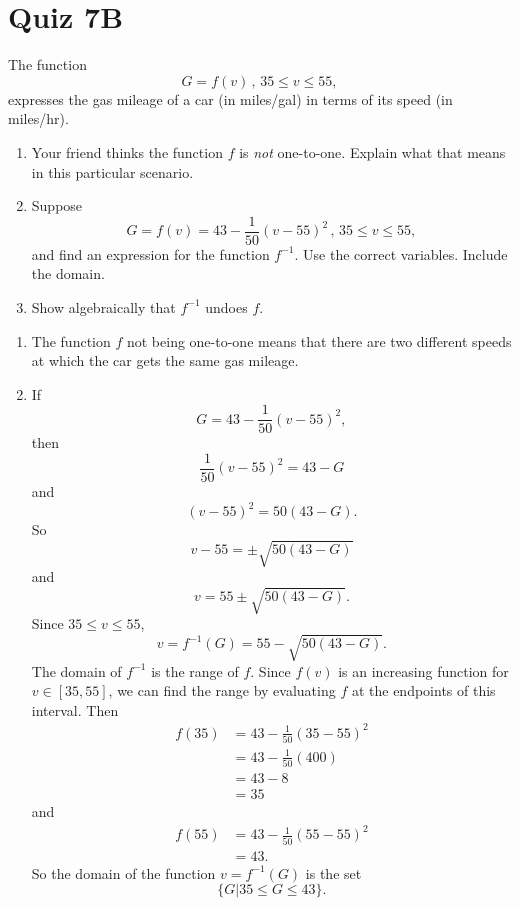 \documentclass{ximera}
\begin{document}
\section{Quiz 7B}
\begin{question} \label{Q7B9efre}
The function
\[
     G = f(v) \, , \, 35\leq v \leq 55,
\]
expresses the gas mileage of a car (in miles/gal) in terms of its speed (in miles/hr).

\begin{enumerate}

\item Your friend thinks the function $f$ is \emph{not} one-to-one. Explain what that means in this particular scenario.

\item Suppose 
\[
       G = f(v) = 43 - \frac{1}{50} \left( v-55 \right)^2 \, , \, 35\leq v \leq 55,
\]
and find an expression for the function $f^{-1}$. Use the correct variables. Include the domain.

\item Show algebraically that $f^{-1}$ undoes $f$.
\end{enumerate}

\begin{explanation}
\begin{enumerate}
\item The function $f$ not being one-to-one means that there are two different speeds at which the car gets the same gas mileage.

\item If
\[
  G = 43 - \frac{1}{50} \left( v-55 \right)^2,
\]
then
\[
       \frac{1}{50} \left( v-55 \right)^2 = 43 - G
\]
and
\[
  \left( v-55 \right)^2 = 50 (43-G).
\]
So
\[
   v - 55 = \pm \sqrt{50(43-G)}
\]
and
\[
  v = 55 \pm \sqrt{50(43-G)}.
\]
Since $35 \leq v \leq 55$,
\[
  v = f^{-1}(G) = 55 - \sqrt{50(43-G)}.
\]
The domain of $f^{-1}$ is the range of $f$. Since $f(v)$ is an increasing function for $v\in [35,55]$, we can find the range by evaluating $f$ at the endpoints of this interval. Then
\begin{align*}
 f(35) &=  43 - \frac{1}{50} \left( 35-55 \right)^2 \\
         &= 43 - \frac{1}{50}\left(400\right) \\
         &= 43 - 8 \\
         &= 35
\end{align*}
and
\begin{align*}
 f(55) &=  43 - \frac{1}{50} \left( 55-55 \right)^2 \\
         &= 43.
\end{align*}
So the domain of the function $v=f^{-1}(G)$ is the set
\[
 \{  G | 35 \leq G \leq 43 \}.
\]


\end{enumerate}
\end{explanation}
\end{question}
\end{document}
